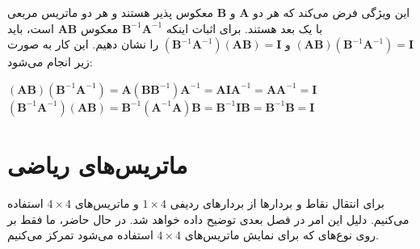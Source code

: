 {\begin{spacing}{1.5}
        این ویژگی فرض می‌کند که هر دو $\textbf{A}$ و $\textbf{B}$ معکوس پذیر هستند و هر دو ماتریس مربعی با یک بعد هستند.
        برای اثبات اینکه $\textbf{B}^{-1}\textbf{A}^{-1}$ معکوس $\textbf{AB}$ است، باید $(\textbf{AB})(\textbf{B}^{-1}\textbf{A}^{-1})=\textbf{I}$ و $(\textbf{B}^{-1}\textbf{A}^{-1})(\textbf{AB})=\textbf{I}$ را نشان دهیم.
        این کار به صورت زیر انجام می‌شود:

        \begin{center}
            $(\textbf{AB})(\textbf{B}^{-1}\textbf{A}^{-1})=\textbf{A}(\textbf{B}\textbf{B}^{-1})\textbf{A}^{-1}=\textbf{A}\textbf{I}\textbf{A}^{-1}=\textbf{A}\textbf{A}^{-1}=\textbf{I}$\\
            $(\textbf{B}^{-1}\textbf{A}^{-1})(\textbf{AB})=\textbf{B}^{-1}(\textbf{A}^{-1}\textbf{A})\textbf{B}=\textbf{B}^{-1}\textbf{I}\textbf{B}=\textbf{B}^{-1}\textbf{B}=\textbf{I}$\\
        \end{center}
    \end{spacing}
}


\section{\textbf{ماتریس‌های ریاضی }}
\label{sec:2.8}
{
    \Large
    \begin{spacing}{1.5}
        برای انتقال نقاط و بردارها از بردارهای ردیفی $1\times 4$ و ماتریس‌های $4\times 4$ استفاده می‌کنیم.
        دلیل این امر در فصل بعدی توضیح داده خواهد شد.
        در حال حاضر، ما فقط بر روی نوع‌های  که برای نمایش ماتریس‌های $4\times 4$ استفاده می‌شود تمرکز می‌کنیم.
    \end{spacing}
}

